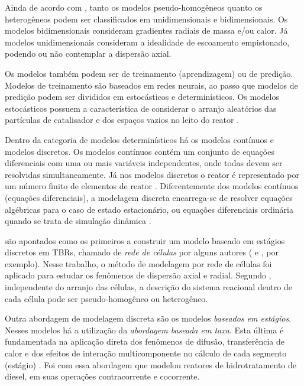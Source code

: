 Ainda de acordo com , tanto os modelos pseudo-homogêneos
quanto os heterogêneos podem ser classificados em unidimensionais e
bidimensionais. Os modelos bidimensionais consideram gradientes radiais de massa
e/ou calor. Já modelos unidimensionais consideram a idealidade de escoamento empistonado, podendo ou não contemplar a dispersão axial.

Os modelos também podem ser de treinamento (aprendizagem) ou de predição.
Modelos de treinamento são baseados em redes neurais, ao passo que modelos de
predição podem ser divididos em estocásticos e determinísticos. Os modelos
estocásticos possuem a característica de considerar o arranjo aleatórios das
partículas de catalisador e dos espaços vazios no leito do reator
\cite{Ancheyta2011}. 

Dentro da categoria de modelos determinísticos há os modelos contínuos e modelos discretos. Os modelos contínuos contém um conjunto de equações diferenciais com uma ou mais variáveis independentes, onde todas devem ser resolvidas simultaneamente. Já nos modelos discretos o reator é representado por um número finito de elementos de reator \cite{Ancheyta2011}. Diferentemente dos modelos contínuos (equações diferenciais), a modelagem discreta encarrega-se de resolver equações algébricas para o caso de estado estacionário, ou equações diferenciais ordinária quando se trata de simulação dinâmica \cite{Schnitzlein1987}.

 são apontados como os primeiros a construir um modelo baseado em estágios discretos em TBRs,
chamado de \emph{rede de células} por alguns
autores ( e , por exemplo).
Nesse trabalho, o método de modelagem por rede de células foi aplicado para estudar os
fenômenos de dispersão axial e radial. Segundo , independente do arranjo das células, a descrição do sistema reacional dentro de cada célula pode ser pseudo-homogêneo ou heterogêneo.

Outra abordagem de modelagem discreta são os modelos \emph{baseados em estágios}. Nesses modelos há
a utilização da \emph{abordagem baseada em taxa}. Esta última é fundamentada na
aplicação direta dos fenômenos de difusão, transferência de calor e dos efeitos
de interação multicomponente no cálculo de cada segmento (estágio)
\cite{Jakobsson2004}. Foi com essa abordagem que 
modelou reatores de hidrotratamento de diesel, em suas operações
contracorrente e cocorrente.

